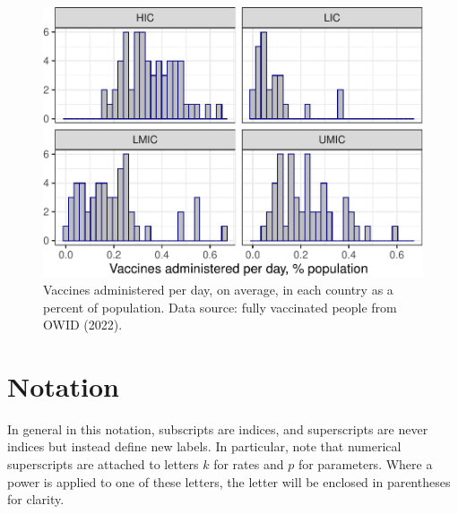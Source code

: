 \documentclass[
]{article}
\makeatletter
\newcounter{figno}
\newenvironment{fignos:no-prefix-figure-caption}{
  \caption@ifcompatibility{}{
    \let\oldthefigure\thefigure
    \let\oldtheHfigure\theHfigure
    \renewcommand{\thefigure}{figno:\thefigno}
    \renewcommand{\theHfigure}{figno:\thefigno}
    \stepcounter{figno}
    \captionsetup{labelformat=empty}
  }
}{
  \caption@ifcompatibility{}{
    \captionsetup{labelformat=default}
    \let\thefigure\oldthefigure
    \let\theHfigure\oldtheHfigure
    \addtocounter{figure}{-1}
  }
}
\makeatother
\begin{document}
\begin{fignos:no-prefix-figure-caption}

\begin{figure}
\centering
\includegraphics{README_files/figure-latex/vaxrate-1.pdf}
\caption{\label{fig:vaxrate}Vaccines administered per day, on average, in each country as a percent of population. Data source: fully vaccinated people from OWID (2022).}
\end{figure}

\end{fignos:no-prefix-figure-caption}

\newpage

\hypertarget{notation}{%
\section{Notation}\label{notation}}

In general in this notation, subscripts are indices, and superscripts are never indices but instead define new labels. In particular, note that numerical superscripts are attached to letters \(k\) for rates and \(p\) for parameters. Where a power is applied to one of these letters, the letter will be enclosed in parentheses for clarity.
\end{document}
